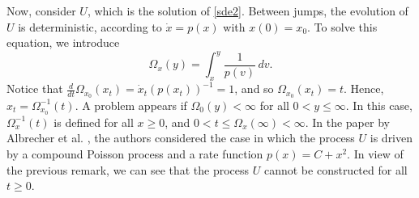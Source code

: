 \documentclass[12pt,reqno]{amsart}
\theoremstyle{definition}
\theoremstyle{remark}
\begin{document}
Now, consider $U$, which is the solution of \eqref{sde2}. Between jumps, the evolution of $U$ is deterministic, according to $\dot{x}=p(x)$ with $x(0)=x_0$. 
To solve this equation, we introduce
$$\Omega_x(y)=\int_x^y\frac{1}{p(v)}\,dv.$$
Notice that $\frac{d}{dt}\Omega_{x_0}(x_t)=\dot{x}_t(p(x_t))^{-1}=1$, and so $\Omega_{x_0}(x_t)=t$. Hence, $x_t=\Omega_{x_0}^{-1}(t)$.
A problem appears if  $\Omega_0(y)<\infty$ for all $0<y\le \infty$. In this case, $\Omega^{-1}_x(t)$ is defined for all $x\ge0$, and $0<t\le \Omega_x(\infty)<\infty$.
In the paper by Albrecher  et al. \cite{Albetal}, the authors considered the case in which the process $U$ is driven by a compound Poisson process and a 
rate function $p(x)=C+x^2$. 
In view of the previous remark, we can see that the process $U$ cannot be constructed for all $t\ge0$.
\begin{comment}
We have the following cases:
\begin{itemize}
\item $\Omega_0(y)<\infty$ and $\Omega_x(\infty)=\infty$. In this case $\Omega^{-1}_x(t)$ is well defined for all $x\ge0$ and $t\ge0$.
\item  $\Omega_0(y)<\infty$ and $\Omega_x(\infty)<\infty$. In this case  $\Omega^{-1}_x(t)$ is defined for all $x\ge0$ and $0<t\le \Omega_x(\infty))$.
\item  $\Omega_0(y)=\infty$ and $\Omega_x(\infty)=\infty$. In this case  $\Omega^{-1}_x(t)$ is defined for all $x>0$ and $t\ge 0$.
\item  $\Omega_0(y)=\infty$ and $\Omega_x(\infty)<\infty$. In this case  $\Omega^{-1}_x(t)$ is defined for all $x>0$ and $t\le \Omega_x(\infty))$.
  \end{itemize}
Therefore we must assume $p(x)\le c+x^\alpha$, where $\alpha\le 1$.
\footnote{In \cite{Albetal} there is an example with $p(x)=c+x^2$, which we are not sure whether in this case it is meaningful to consider the risk process $U$.}
\end{comment}
\end{document}
